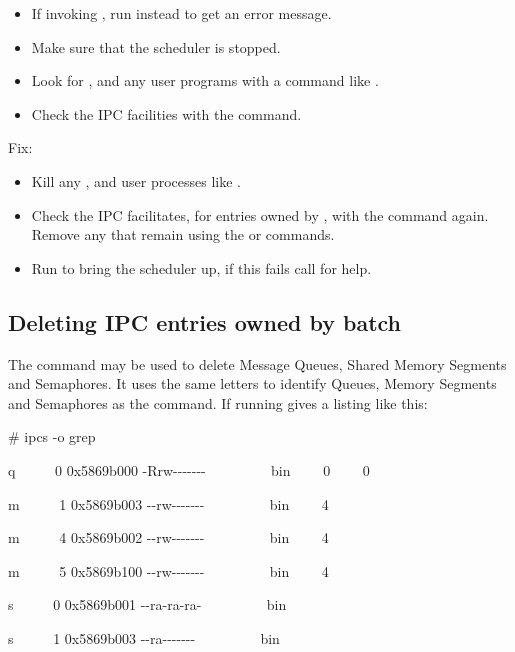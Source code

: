 \begin{itemize}
\item If invoking , run \PrBtstart{} instead to get an error message.
\item Make sure that the scheduler is stopped. \item Look for ,
 and any user programs with a command like .
\item Check the IPC facilities with the  command.
\end{itemize}

Fix:

\begin{itemize}
\item Kill any ,  and user processes like \PrBtq{}.
\item Check the IPC facilitates, for entries owned by \batchuser{}, with the 
command again. Remove any that remain using the  or  commands.
\item Run \PrBtstart{} to bring the scheduler up, if this fails call for help.
\end{itemize}

\subsection{Deleting IPC entries owned by batch}
The  command may be used to delete Message Queues, Shared Memory Segments and Semaphores. It uses the same letters to identify Queues, Memory Segments and Semaphores as the  command. If running  gives a listing like
this:

\begin{expara}

\# ipcs -o {\textbar} grep \batchusername{}

\bigskip

q \ \ \ \ \ 0 0x5869b000 -Rrw-{}-{}-{}-{}-{}-{}- \ \ \ \batchusername{}
\ \ \ \ \ bin \ \ \ \ 0 \ \ \ \ 0

m \ \ \ \ \ 1 0x5869b003 -{}-rw-{}-{}-{}-{}-{}-{}- \ \ \ \batchusername{}
\ \ \ \ \ bin \ \ \ \ 4

m \ \ \ \ \ 4 0x5869b002 -{}-rw-{}-{}-{}-{}-{}-{}- \ \ \ \batchusername{}
\ \ \ \ \ bin \ \ \ \ 4

m \ \ \ \ \ 5 0x5869b100 -{}-rw-{}-{}-{}-{}-{}-{}- \ \ \ \batchusername{}
\ \ \ \ \ bin \ \ \ \ 4

s \ \ \ \ \ 0 0x5869b001 -{}-ra-ra-ra- \ \ \ \batchusername{} \ \ \ \ \ bin

s \ \ \ \ \ 1 0x5869b003 -{}-ra-{}-{}-{}-{}-{}-{}- \ \ \ \batchusername{}
\ \ \ \ \ bin

\end{expara}

